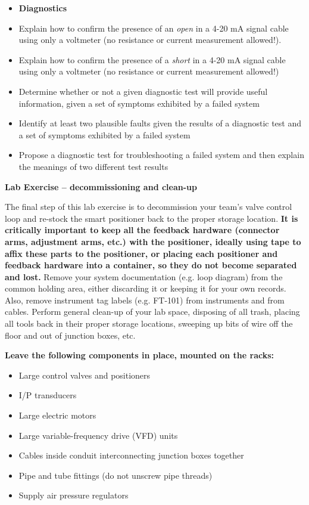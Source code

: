 \begin{itemize}
\filbreak

\begin{itemize}
\item{} {\bf Diagnostics}
\item{} Explain how to confirm the presence of an {\it open} in a 4-20 mA signal cable using only a voltmeter (no resistance or current measurement allowed!).
\item{} Explain how to confirm the presence of a {\it short} in a 4-20 mA signal cable using only a voltmeter (no resistance or current measurement allowed!)  
\item{} Determine whether or not a given diagnostic test will provide useful information, given a set of symptoms exhibited by a failed system
\item{} Identify at least two plausible faults given the results of a diagnostic test and a set of symptoms exhibited by a failed system
\item{} Propose a diagnostic test for troubleshooting a failed system and then explain the meanings of two different test results
\end{itemize}



\vfil \eject

\noindent
{\bf Lab Exercise -- decommissioning and clean-up}

\vskip 5pt

The final step of this lab exercise is to decommission your team's valve control loop and re-stock the smart positioner back to the proper storage location.  {\bf It is critically important to keep all the feedback hardware (connector arms, adjustment arms, etc.) with the positioner, ideally using tape to affix these parts to the positioner, or placing each positioner and feedback hardware into a container, so they do not become separated and lost.}  Remove your system documentation (e.g. loop diagram) from the common holding area, either discarding it or keeping it for your own records.  Also, remove instrument tag labels (e.g. FT-101) from instruments and from cables.  Perform general clean-up of your lab space, disposing of all trash, placing all tools back in their proper storage locations, sweeping up bits of wire off the floor and out of junction boxes, etc.

\vskip 10pt

\indent
{\bf Leave the following components in place, mounted on the racks:}

\begin{itemize}
\item{} Large control valves and positioners
\item{} I/P transducers
\item{} Large electric motors
\item{} Large variable-frequency drive (VFD) units
\item{} Cables inside conduit interconnecting junction boxes together
\item{} Pipe and tube fittings (do not unscrew pipe threads)
\item{} Supply air pressure regulators
\end{itemize}


\end{itemize}
